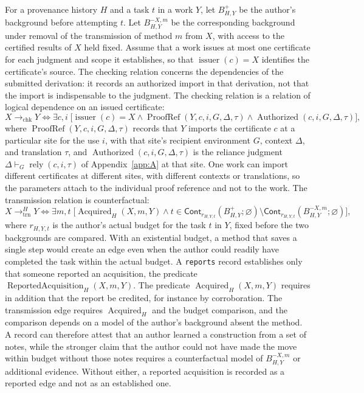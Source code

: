 \documentclass[11pt]{book}
\theoremstyle{definition}
\theoremstyle{remark}
\newcommand{\Cont}{\mathsf{Cont}}
\begin{document}
For a provenance history $H$ and a task $t$ in a work $Y$, let $B^+_{H,Y}$ be the author's background before attempting $t$. Let $B^{-X,m}_{H,Y}$ be the corresponding background under removal of the transmission of method $m$ from $X$, with access to the certified results of $X$ held fixed. Assume that a work issues at most one certificate for each judgment and scope it establishes, so that $\operatorname{issuer}(c)=X$ identifies the certificate's source. The checking relation concerns the dependencies of the submitted derivation: it records an authorized import in that derivation, not that the import is indispensable to the judgment. The checking relation is a relation of logical dependence on an issued certificate:
\[
X\to_{\mathrm{chk}}Y\iff\exists c,i\;
\bigl[\operatorname{issuer}(c)=X\land\operatorname{ProofRef}(Y,c,i,G,\Delta,\tau)\land\operatorname{Authorized}(c,i,G,\Delta,\tau)\bigr],
\]
where $\operatorname{ProofRef}(Y,c,i,G,\Delta,\tau)$ records that $Y$ imports the certificate $c$ at a particular site for the use $i$, with that site's recipient environment $G$, context $\Delta$, and translation $\tau$, and $\operatorname{Authorized}(c,i,G,\Delta,\tau)$ is the reliance judgment $\Delta\vdash_{G}\operatorname{rely}(c,i,\tau)$ of Appendix~\ref{app:A} at that site. One work can import different certificates at different sites, with different contexts or translations, so the parameters attach to the individual proof reference and not to the work. The transmission relation is counterfactual:
\[
X\to^{H}_{\mathrm{trn}}Y\iff\exists m,t\;
\bigl[\operatorname{Acquired}_H(X,m,Y)\land
t\in\Cont_{r_{H,Y,t}}(B^+_{H,Y};\varnothing)\setminus\Cont_{r_{H,Y,t}}(B^{-X,m}_{H,Y};\varnothing)\bigr],
\]
where $r_{H,Y,t}$ is the author's actual budget for the task $t$ in $Y$, fixed before the two backgrounds are compared. With an existential budget, a method that saves a single step would create an edge even when the author could readily have completed the task within the actual budget. A \texttt{reports} record establishes only that someone reported an acquisition, the predicate $\operatorname{ReportedAcquisition}_H(X,m,Y)$. The predicate $\operatorname{Acquired}_H(X,m,Y)$ requires in addition that the report be credited, for instance by corroboration. The transmission edge requires $\operatorname{Acquired}_H$ and the budget comparison, and the comparison depends on a model of the author's background absent the method. A record can therefore attest that an author learned a construction from a set of notes, while the stronger claim that the author could not have made the move within budget without those notes requires a counterfactual model of $B^{-X,m}_{H,Y}$ or additional evidence. Without either, a reported acquisition is recorded as a reported edge and not as an established one.
\end{document}

